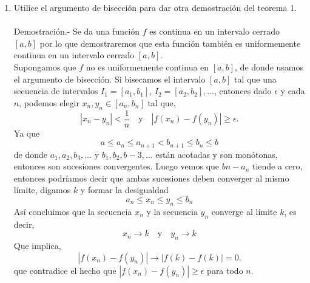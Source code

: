 \begin{enumerate}[\bfseries 1.]
\begin{enumerate}[\bfseries (a)]
	\end{enumerate}

    \item Utilice el argumento de bisección para dar otra demostración del teorema 1.\\\\
	Demostración.-\; Se da una función $f$ es continua en un intervalo cerrado $[a,b]$ por lo que demostraremos que esta función también es uniformemente continua en un intervalo cerrado $[a,b]$.\\
	Supongamos que $f$ no es uniformemente continua en $[a,b]$, de donde usamos el argumento de bisección. Si bisecamos el intervalo $[a,b]$ tal que una secuencia de intervalos $I_1=[a_1,b_1]$, $I_2=[a_2,b_2], \ldots$, entonces dado $\epsilon$ y cada $n$, podemos elegir $x_n,y_n\in [a_n,b_n]$ tal que,
	$$|x_n-y_n|<\dfrac{1}{n}\quad \mbox{y}\quad |f(x_n)-f(y_n)|\geq \epsilon.$$
	Ya que $$a\leq a_n \leq a_{n+1}<b_{n+1}\leq b_n\leq b$$
	de donde $a_1,a_2,b_3,\ldots$ y $b_1,b_2,b-3,\ldots$ están acotadas y son monótonas, entonces son sucesiones convergentes. Luego vemos que $bn-a_n$ tiende a cero, entonces podríamos decir que ambas sucesiones deben converger al mismo límite, digamos $k$ y formar la desigualdad
	$$a_n\leq x_n\leq y_n\leq b_n$$
    Así concluimos que la secuencia ${x_n}$ y la secuencia ${y_n}$ converge al límite $k$, es decir,
    $$x_n\to k\quad \mbox{y}\quad y_n\to k$$
    Que implica,
    $$|f(x_n)-f(y_n)|\to |f(k)-f(k)|=0.$$
    que contradice el hecho que $|f(x_n)-f(y_n)|\geq \epsilon$ para todo $n$.\\\\


\end{enumerate}
